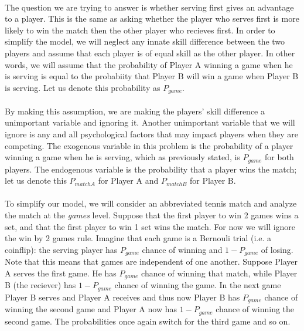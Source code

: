 \documentclass[12pt]{article}
\begin{document}
\paragraph{} The question we are trying to answer is whether serving first gives an advantage to a player. This is the same as asking whether the player who serves first is more likely to win the match then the other player who recieves first. In order to simplify the model, we will neglect any innate skill difference between the two players and assume that each player is of equal skill as the other player. In other words, we will assume that the probability of Player A winning a game when he is serving is equal to the probabiity that Player B will win a game when Player B is serving. Let us denote this probability as $P_{game}$.

\paragraph{} By making this assumption, we are making the players' skill difference a unimportant variable and ignoring it. Another unimportant variable that we will ignore is any and all psychological factors that may impact players when they are competing. The exogenous variable in this problem is the probability of a player winning a game when he is serving, which as previously stated, is $P_{game}$ for both players. The endogenous variable is the probability that a player wins the match; let us denote this $P_{matchA}$ for Player A and $P_{matchB}$ for Player B.

\paragraph{} To simplify our model, we will consider an abbreviated tennis match and analyze the match at the \emph{games} level. Suppose that the first player to win 2 games wins a set, and that the first player to win 1 set wins the match. For now we will ignore the win by 2 games rule. Imagine that each game is a Bernouli trial (i.e. a coinflip): the serving player has $P_{game}$ chance of winning and $1-P_{game}$ of losing. Note that this means that games are independent of one another. Suppose Player A serves the first game. He has $P_{game}$ chance of winning that match, while Player B (the reciever) has $1-P_{game}$ chance of winning the game. In the next game Player B serves and Player A receives and thus now Player B has $P_{game}$ chance of winning the second game and Player A now has $1-P_{game}$ chance of winning the second game. The probabilities once again switch for the third game and so on.
\end{document}
